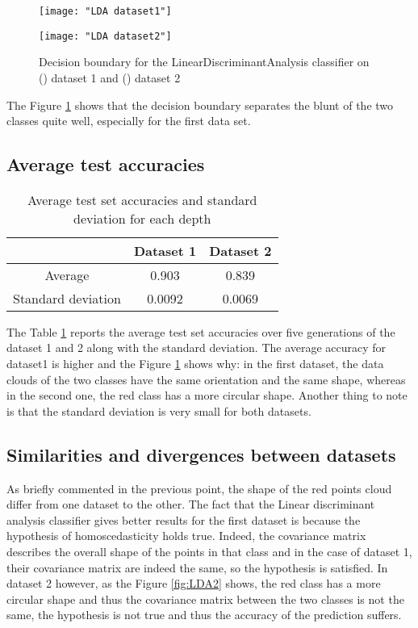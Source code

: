 \documentclass[12pt]{article}
\begin{document}
\begin{figure}[htbp]
\centering
\begin{minipage}{0.5\linewidth}%
  \centering
  \texttt{[image: "LDA dataset1"]}%
\label{fig:LDA1}%
\end{minipage}%
\begin{minipage}{0.5\linewidth}%
  \centering
  \texttt{[image: "LDA dataset2"]}%
\label{fig:LDA2}%
\end{minipage}%

\caption{ \label{fig:LDA} Decision boundary for the LinearDiscriminantAnalysis classifier on () dataset 1 and () dataset 2}
\end{figure}

The Figure \ref{fig:LDA} shows that the decision boundary separates the blunt of the two classes quite well, especially for the first data set. 

\subsection{Average test accuracies}
\begin{table}[h!]
    \centering
    \begin{tabular}{|c|c|c|}
  \hline
 & Dataset 1 & Dataset 2 \\
  \hline
  Average &  0.903  & 0.839 \\
  \hline
  Standard deviation & 0.0092 & 0.0069 \\
  \hline
\end{tabular}
    \caption{Average test set accuracies and standard deviation for each depth}
    \label{tab:mean_lda}
\end{table}

The Table \ref{tab:mean_lda} reports the average test set accuracies over five generations of the dataset 1 and 2 along with the standard deviation.
The average accuracy for dataset1 is higher and the Figure \ref{fig:LDA} shows why: in the first dataset, the data clouds of the two classes have the same orientation and the same shape, whereas in the second one, the red class has a more circular shape.
Another thing to note is that the standard deviation is very small for both datasets.
\subsection{Similarities and divergences between datasets}
As briefly commented in the previous point, the shape of the red points cloud differ from one dataset to the other. 
The fact that the Linear discriminant analysis classifier gives better results for the first dataset is because the hypothesis of homoscedasticity holds true. Indeed, the covariance matrix describes the overall shape of the points in that class and in the case of dataset 1, their covariance matrix are indeed the same, so the hypothesis is satisfied. In dataset 2 however, as the Figure \ref{fig:LDA2} shows, the red class has a more circular shape and thus the covariance matrix between the two classes is not the same, the hypothesis is not true and thus the accuracy of the prediction suffers.
\end{document}
